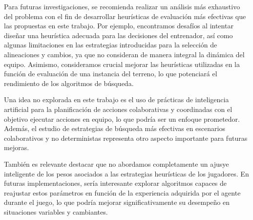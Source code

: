 \documentclass{article}
\begin{document}


Para futuras investigaciones, se recomienda realizar un análisis más exhaustivo del problema con el fin de desarrollar heurísticas de evaluación más 
efectivas que las propuestas en este trabajo. Por ejemplo, encontramos desafíos al intentar diseñar una heurística adecuada para las decisiones del entrenador, 
así como algunas limitaciones en las estrategias introducidas para la selección de alineaciones y cambios, ya que no consideran de manera integral la 
dinámica del equipo. Asimismo, consideramos crucial mejorar las heurísticas utilizadas en la función de evaluación de una instancia del terreno, lo que 
potenciará el rendimiento de los algoritmos de búsqueda.

Una idea no explorada en este trabajo es el uso de prácticas de inteligencia artificial para la planificación de acciones colaborativas y coordinadas 
con el objetivo ejecutar acciones en equipo, lo que podría ser un enfoque prometedor. Además, el estudio de estrategias de búsqueda más efectivas en 
escenarios colaborativos y no deterministas representa otro aspecto importante para futuras mejoras.

También es relevante destacar que no abordamos completamente un ajusye inteligente de los pesos asociados a las estrategias heurísticas de los jugadores. 
En futuras implementaciones, sería interesante explorar algoritmos capaces de reajustar estos parámetros en función de la experiencia adquirida por el 
agente durante el juego, lo que podría mejorar significativamente su desempeño en situaciones variables y cambiantes.
\end{document}
